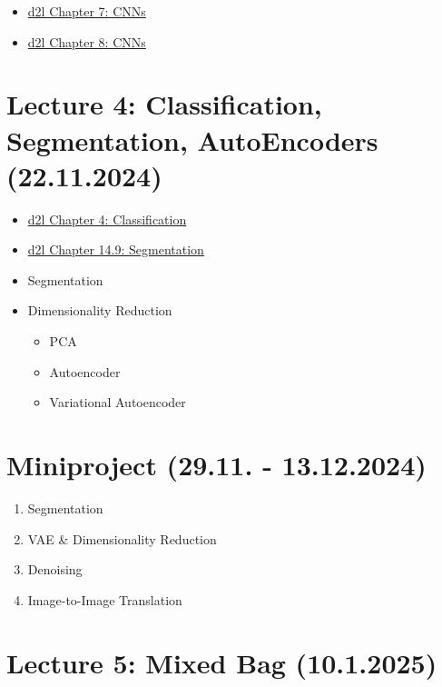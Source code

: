 \documentclass[
]{agujournal2019}
\providecommand{\tightlist}{%
  \setlength{\itemsep}{0pt}\setlength{\parskip}{0pt}}\usepackage{longtable,booktabs,array}
\begin{document}
\begin{itemize}
\tightlist
\item
  \href{https://d2l.ai/chapter_convolutional-neural-networks/index.html}{d2l
  Chapter 7: CNNs}
\item
  \href{https://d2l.ai/chapter_convolutional-modern/index.html}{d2l
  Chapter 8: CNNs}
\end{itemize}

\section{Lecture 4: Classification, Segmentation, AutoEncoders
(22.11.2024)}\label{sec-lecture4}

\begin{itemize}
\tightlist
\item
  \href{https://d2l.ai/chapter_linear-classification/index.html}{d2l
  Chapter 4: Classification}
\item
  \href{https://d2l.ai/chapter_computer-vision/semantic-segmentation-and-dataset.html}{d2l
  Chapter 14.9: Segmentation}
\item
  Segmentation
\item
  Dimensionality Reduction

  \begin{itemize}
  \tightlist
  \item
    PCA
  \item
    Autoencoder
  \item
    Variational Autoencoder
  \end{itemize}
\end{itemize}

\section{Miniproject (29.11. - 13.12.2024)}\label{sec-lecture5}

\begin{enumerate}
\def\labelenumi{\arabic{enumi}.}
\tightlist
\item
  Segmentation
\item
  VAE \& Dimensionality Reduction
\item
  Denoising
\item
  Image-to-Image Translation
\end{enumerate}

\section{Lecture 5: Mixed Bag (10.1.2025)}\label{sec-lecture6}
\end{document}

